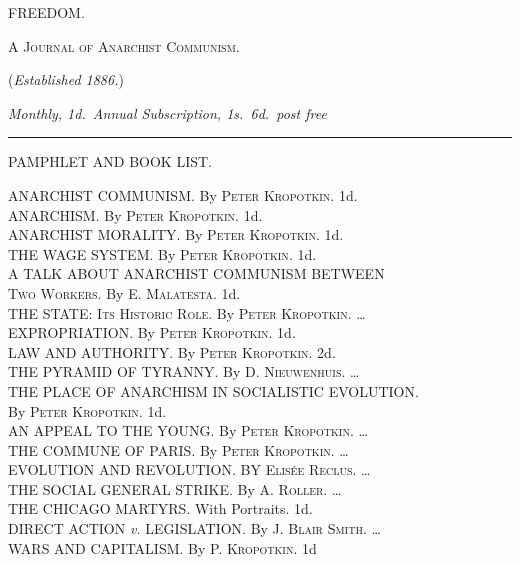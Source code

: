 \documentclass[oneside]{book}
\begin{document}
\begin{center}{\large FREEDOM.}\end{center}

\begin{center}{\textsc{A Journal of Anarchist Communism.}}\end{center}

\begin{center}{(\textit{Established 1886.})}\end{center}

\begin{center}{\textit{Monthly, 1d.\ Annual Subscription, 1s.\ 6d.\ post free}}\end{center}

\medskip\hrule\medskip


\begin{center}{\large PAMPHLET AND BOOK LIST.}\end{center}

\noindent ANARCHIST COMMUNISM\@. By \textsc{Peter Kropotkin}. 1d.\\
ANARCHISM\@. By \textsc{Peter Kropotkin}. 1d.\\
ANARCHIST MORALITY\@. By \textsc{Peter Kropotkin}. 1d.\\
THE WAGE SYSTEM\@. By \textsc{Peter Kropotkin}. 1d.\\
A TALK ABOUT ANARCHIST COMMUNISM BETWEEN\\
\indent \textsc{Two Workers}. By \textsc{E. Malatesta}. 1d.\\
THE STATE: \textsc{Its Historic Role.} By \textsc{Peter Kropotkin}. \dots\\
EXPROPRIATION\@. By \textsc{Peter Kropotkin}. 1d.\\
LAW AND AUTHORITY\@. By \textsc{Peter Kropotkin}. 2d.\\
THE PYRAMID OF TYRANNY\@. By \textsc{D. Nieuwenhuis}. \dots\\
THE PLACE OF ANARCHISM IN SOCIALISTIC EVOLUTION.\\
\indent By \textsc{Peter Kropotkin}. 1d.\\
AN APPEAL TO THE YOUNG\@. By \textsc{Peter Kropotkin}. \dots\\
THE COMMUNE OF PARIS\@. By \textsc{Peter Kropotkin}. \dots\\
EVOLUTION AND REVOLUTION\@. BY \textsc{Elis\'{e}e Reclus}. \dots\\
THE SOCIAL GENERAL STRIKE\@. By \textsc{A. Roller}. \dots\\
THE CHICAGO MARTYRS\@. With Portraits. 1d.\\
DIRECT ACTION \textit{v.} LEGISLATION\@. By \textsc{J. Blair Smith}. \dots\\
WARS AND CAPITALISM\@. By \textsc{P. Kropotkin}. 1d
\end{document}
